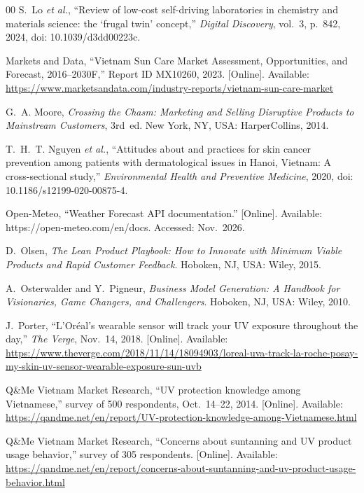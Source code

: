 \documentclass[12pt,a4paper]{article}
\numberwithin{table}{section}    %
\numberwithin{figure}{section}   %
\begin{document}
\begin{thebibliography}{00}
S.~Lo \emph{et al.}, ``Review of low-cost self-driving laboratories in chemistry and materials science: the
`frugal twin' concept,'' \emph{Digital Discovery}, vol.~3, p.~842, 2024, doi: 10.1039/d3dd00223c.

Markets and Data, ``Vietnam Sun Care Market Assessment, Opportunities, and Forecast, 2016--2030F,''
Report ID MX10260, 2023. [Online]. Available:
\url{https://www.marketsandata.com/industry-reports/vietnam-sun-care-market}

G.~A. Moore, \emph{Crossing the Chasm: Marketing and Selling Disruptive Products to Mainstream Customers},
3rd~ed. New York, NY, USA: HarperCollins, 2014.

T.~H.~T. Nguyen \emph{et al.}, ``Attitudes about and practices for skin cancer prevention among patients with
dermatological issues in Hanoi, Vietnam: A cross-sectional study,''
\emph{Environmental Health and Preventive Medicine}, 2020, doi: 10.1186/s12199-020-00875-4.

Open-Meteo, ``Weather Forecast API documentation.'' [Online]. Available: https://open-meteo.com/en/docs.
Accessed: Nov.~2026.

D.~Olsen, \emph{The Lean Product Playbook: How to Innovate with Minimum Viable Products and Rapid Customer
Feedback}. Hoboken, NJ, USA: Wiley, 2015.

A.~Osterwalder and Y.~Pigneur, \emph{Business Model Generation: A Handbook for Visionaries, Game Changers, and
Challengers}. Hoboken, NJ, USA: Wiley, 2010.

J.~Porter, ``L'Or\'eal's wearable sensor will track your UV exposure throughout the day,''
\emph{The Verge}, Nov.~14, 2018. [Online]. Available:
\url{https://www.theverge.com/2018/11/14/18094903/loreal-uva-track-la-roche-posay-my-skin-uv-sensor-wearable-exposure-sun-uvb}

Q\&Me Vietnam Market Research, ``UV protection knowledge among Vietnamese,'' survey of 500 respondents,
Oct.~14--22, 2014. [Online]. Available:
\url{https://qandme.net/en/report/UV-protection-knowledge-among-Vietnamese.html}

Q\&Me Vietnam Market Research, ``Concerns about suntanning and UV product usage behavior,''
survey of 305 respondents. [Online]. Available:
\url{https://qandme.net/en/report/concerns-about-suntanning-and-uv-product-usage-behavior.html}


\end{thebibliography}
\end{document}
